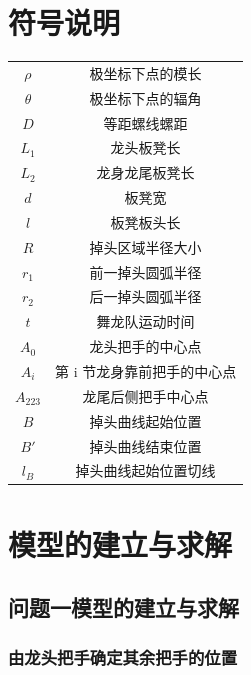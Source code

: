 \documentclass[a4paper]{article}
\begin{document}
	\section{符号说明}
	\begin{table}[H] %
		\captionsetup{skip=4pt} %
		\centering
		\setlength{\arrayrulewidth}{2pt} %
		\begin{tabular}{cc} %
			\hline
			\makebox[0.15\textwidth][c]{符号} & \makebox[0.6\textwidth][c]{说明}  \\
			\hline
			$\rho$ & 极坐标下点的模长  \\
			$\theta$ & 极坐标下点的辐角  \\
			$D$ & 等距螺线螺距  \\
			$L_1$ & 龙头板凳长  \\
			$L_2$ & 龙身龙尾板凳长  \\
			$d$ & 板凳宽  \\
			$l$ & 板凳板头长 \\
			$R$ & 掉头区域半径大小\\
			$r_1$ & 前一掉头圆弧半径\\
			$r_2$ & 后一掉头圆弧半径\\
			$t$ & 舞龙队运动时间  \\
			$A_0$ & 龙头把手的中心点  \\
			$A_i$ & 第 i 节龙身靠前把手的中心点  \\
			$A_{223}$ & 龙尾后侧把手中心点  \\
			$B$ & 掉头曲线起始位置 \\
			$B'$ & 掉头曲线结束位置 \\
			$l_B$ & 掉头曲线起始位置切线 \\
			\hline
		\end{tabular}
	\end{table}


	\section{模型的建立与求解}
	\subsection{问题一模型的建立与求解}
	\subsubsection{由龙头把手确定其余把手的位置}
\end{document}
